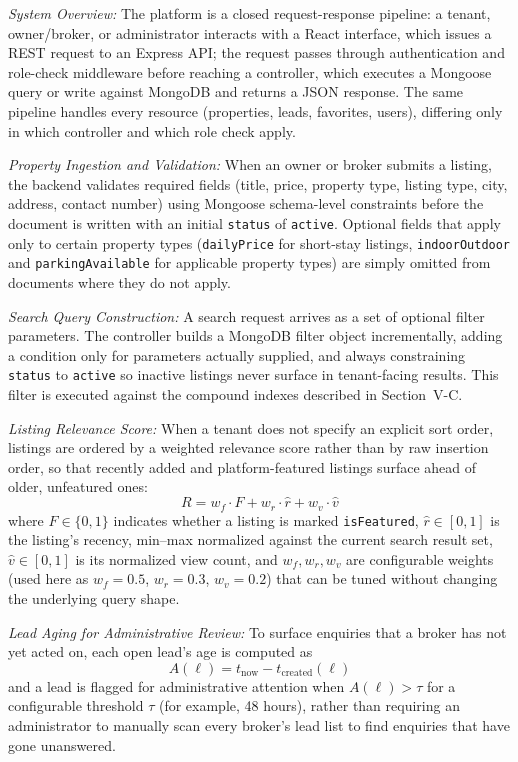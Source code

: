 \documentclass[10pt,twocolumn]{article}
\begin{document}
\textit{System Overview:} The platform is a closed request-response pipeline: a tenant, owner/broker, or administrator interacts with a React interface, which issues a REST request to an Express API; the request passes through authentication and role-check middleware before reaching a controller, which executes a Mongoose query or write against MongoDB and returns a JSON response. The same pipeline handles every resource (properties, leads, favorites, users), differing only in which controller and which role check apply.

\textit{Property Ingestion and Validation:} When an owner or broker submits a listing, the backend validates required fields (title, price, property type, listing type, city, address, contact number) using Mongoose schema-level constraints before the document is written with an initial \texttt{status} of \texttt{active}. Optional fields that apply only to certain property types (\texttt{dailyPrice} for short-stay listings, \texttt{indoorOutdoor} and \texttt{parkingAvailable} for applicable property types) are simply omitted from documents where they do not apply.

\textit{Search Query Construction:} A search request arrives as a set of optional filter parameters. The controller builds a MongoDB filter object incrementally, adding a condition only for parameters actually supplied, and always constraining \texttt{status} to \texttt{active} so inactive listings never surface in tenant-facing results. This filter is executed against the compound indexes described in Section~V-C.

\textit{Listing Relevance Score:} When a tenant does not specify an explicit sort order, listings are ordered by a weighted relevance score rather than by raw insertion order, so that recently added and platform-featured listings surface ahead of older, unfeatured ones:
\begin{equation}
R = w_f \cdot F + w_r \cdot \hat{r} + w_v \cdot \hat{v}
\label{eq:relevance}
\end{equation}
where $F \in \{0,1\}$ indicates whether a listing is marked \texttt{isFeatured}, $\hat{r} \in [0,1]$ is the listing's recency, min--max normalized against the current search result set, $\hat{v} \in [0,1]$ is its normalized view count, and $w_f, w_r, w_v$ are configurable weights (used here as $w_f=0.5$, $w_r=0.3$, $w_v=0.2$) that can be tuned without changing the underlying query shape.

\textit{Lead Aging for Administrative Review:} To surface enquiries that a broker has not yet acted on, each open lead's age is computed as
\begin{equation}
A(\ell) = t_{\text{now}} - t_{\text{created}}(\ell)
\label{eq:aging}
\end{equation}
and a lead is flagged for administrative attention when $A(\ell) > \tau$ for a configurable threshold $\tau$ (for example, 48 hours), rather than requiring an administrator to manually scan every broker's lead list to find enquiries that have gone unanswered.
\end{document}
